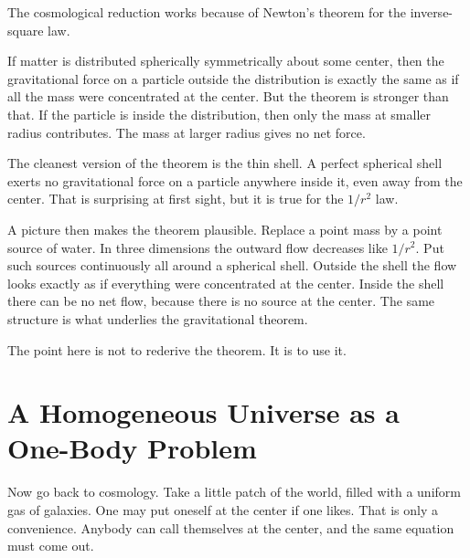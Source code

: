 The cosmological reduction works because of Newton's theorem for the inverse-square law.

If matter is distributed spherically symmetrically about some center, then the gravitational force on a particle outside the distribution is exactly the same as if all the mass were concentrated at the center. But the theorem is stronger than that. If the particle is inside the distribution, then only the mass at smaller radius contributes. The mass at larger radius gives no net force.

The cleanest version of the theorem is the thin shell. A perfect spherical shell exerts no gravitational force on a particle anywhere inside it, even away from the center. That is surprising at first sight, but it is true for the \(1/r^2\) law.

\begin{classroomqa}
\end{classroomqa}

A picture then makes the theorem plausible. Replace a point mass by a point source of water. In three dimensions the outward flow decreases like \(1/r^2\). Put such sources continuously all around a spherical shell. Outside the shell the flow looks exactly as if everything were concentrated at the center. Inside the shell there can be no net flow, because there is no source at the center. The same structure is what underlies the gravitational theorem.

The point here is not to rederive the theorem. It is to use it.

\section{A Homogeneous Universe as a One-Body Problem}

Now go back to cosmology. Take a little patch of the world, filled with a uniform gas of galaxies. One may put oneself at the center if one likes. That is only a convenience. Anybody can call themselves at the center, and the same equation must come out.

